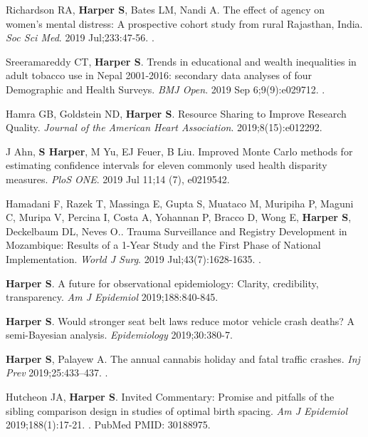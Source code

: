 \documentclass[
  letterpaper,
  DIV=11,
  numbers=noendperiod]{scrartcl}
\begin{document}
\begin{etaremune}
\item *Richardson RA, \textbf{Harper S}, Bates LM, Nandi A. The effect of agency on women's mental distress: A prospective cohort study from rural Rajasthan, India. \emph{Soc Sci Med}. 2019 Jul;233:47-56. .

\item Sreeramareddy CT, \textbf{Harper S}. Trends in educational and wealth inequalities in adult tobacco use in Nepal 2001-2016: secondary data analyses of four Demographic and Health Surveys. \emph{BMJ Open}. 2019 Sep 6;9(9):e029712. .

\item Hamra GB, Goldstein ND, \textbf{Harper S}. Resource Sharing to Improve Research Quality. \emph{Journal of the American Heart Association}. 2019;8(15):e012292.

\item J Ahn, \textbf{S Harper}, M Yu, EJ Feuer, B Liu. Improved Monte Carlo methods for estimating confidence intervals for eleven commonly used health disparity measures. \emph{PloS ONE}. 2019 Jul 11;14 (7), e0219542.

\item Hamadani F, Razek T, Massinga E, Gupta S, Muataco M, Muripiha P, Maguni C, Muripa V, Percina I, Costa A, Yohannan P, Bracco D, Wong E, \textbf{Harper S}, Deckelbaum DL, Neves O.. Trauma Surveillance and Registry Development in Mozambique: Results of a 1-Year Study and the First Phase of National Implementation. \emph{World J Surg}. 2019 Jul;43(7):1628-1635. .

\item \textbf{Harper S}. A future for observational epidemiology: Clarity, credibility, transparency. \emph{Am J Epidemiol} 2019;188:840-845.

\item \textbf{Harper S}. Would stronger seat belt laws reduce motor vehicle crash deaths? A semi-Bayesian analysis. \emph{Epidemiology} 2019;30:380-7.

\item \textbf{Harper S}, Palayew A. The annual cannabis holiday and fatal traffic crashes. \emph{Inj Prev} 2019;25:433–437. .

\item Hutcheon JA, \textbf{Harper S}. Invited Commentary: Promise and pitfalls of the sibling comparison design in studies of optimal birth spacing. \emph{Am J Epidemiol} 2019;188(1):17-21. . PubMed PMID: 30188975.


\end{etaremune}
\end{document}

